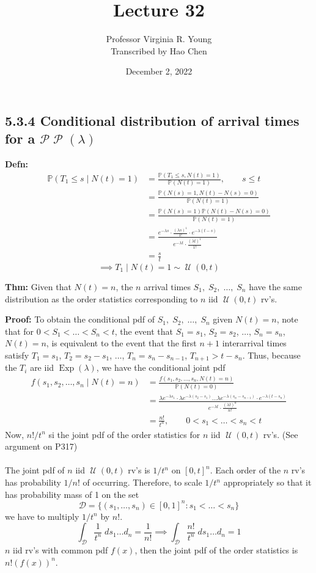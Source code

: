 \documentclass[a4paper]{article}
\title{Lecture 32}
\author{Professor Virginia R. Young\\ \small{Transcribed by Hao Chen}}
\date{December 2, 2022}
\newcommand{\n}{\hfill\break}
\newcommand{\defn}[1]{\par\noindent\settowidth{\hangindent}{\textbf{Defn: }}\textbf{Defn: }#1\n}
\newcommand{\thm}[1]{\par\noindent\settowidth{\hangindent}{\textbf{Thm: }}\textbf{Thm: }#1\n}
\newcommand{\pf}[1]{\par\noindent\settowidth{\hangindent}{\textbf{Proof: }}\textbf{Proof: }#1\n}
\newcommand{\Prob}{\mathbb{P}}
\renewcommand{\P}{\Prob}
\DeclareMathOperator{\Unif}{\mathcal{U}}
\DeclareMathOperator{\Poiss}{\mathcal{P}}
\DeclareMathOperator{\Exp}{\text{Exp}}
\begin{document}
\maketitle

\subsection*{5.3.4 Conditional distribution of arrival times for a $\mathcal{P}\Poiss(\lambda)$}

\defn{
\begin{align*}
    \P(T_1\leq s\mid N(t)=1)&=\frac{\P(T_1\leq s, N(t)=1)}{\P(N(t)=1)},\qquad s\leq t \\
    &=\frac{\P(N(s)=1, N(t)-N(s)=0)}{\P(N(t)=1)} \\
    &=\frac{\P(N(s)=1)\P(N(t)-N(s)=0)}{\P(N(t)=1)} \\ %
    &=\frac{e^{-\lambda s}\cdot\frac{(\lambda s)^1}{1!}\cdot e^{-\lambda(t-s)}}{e^{-\lambda t}\cdot\frac{(\lambda t)^1}{1!}} \\
    &=\frac{s}{t}
\end{align*}
\[\implies T_1\mid N(t)=1\sim\Unif(0,t)\]
}

\thm{
Given that $N(t)=n$, the $n$ arrival times $S_1,\;S_2,\;\dots,\;S_n$ have the same distribution as the order statistics corresponding to $n$ iid $\Unif(0, t)$ rv's.
}

\pf{
To obtain the conditional pdf of $S_1,\;S_2,\;\dots,\;S_n$ given $N(t)=n$, note that for $0<S_1<\dots<S_n<t$, the event that $S_1=s_1$, $S_2=s_2$, $\dots$, $S_n=s_n$, $N(t)=n$, is equivalent to the event that the first $n+1$ interarrival times satisfy $T_1=s_1$, $T_2=s_2-s_1$, $\dots$, $T_n=s_n-s_{n-1}$, $T_{n+1}>t-s_n$. Thus, because the $T_i$ are iid $\Exp(\lambda)$, we have the conditional joint pdf
\begin{align*}
    f(s_1, s_2, \dots, s_n\mid N(t)=n)&=\frac{f(s_1, s_2, \dots, s_n, N(t)=n)}{\P(N(t)=0)} \\
    &=\frac{\lambda e^{-\lambda s_1}\cdot\lambda e^{-\lambda(s_2-s_1)}\dots\lambda e^{-\lambda(s_n-s_{n-1})}\cdot e^{-\lambda(t-s_n)}}{e^{-\lambda t}\cdot\frac{(\lambda t)^n}{n!}} \\
    &=\frac{n!}{t^n}, \qquad 0<s_1<\dots<s_n<t
\end{align*}
Now, $n!/t^n$ si the joint pdf of the order statistics for $n$ iid $\Unif(0, t)$ rv's. (See argument on P317)
\\\\
The joint pdf of $n$ iid $\Unif(0,t)$ rv's is $1/t^n$ on $[0,t]^n$. Each order of the $n$ rv's has probability $1/n!$ of occurring. Therefore, to scale $1/t^n$ appropriately so that it has probability mass of 1 on the set 
\[\mathcal{D}=\{(s_1, \dots, s_n)\in[0,1]^n:s_1<\dots<s_n\}\]
we have to multiply $1/t^n$ by $n!$.
\[\int_\mathcal{D}\frac{1}{t^n}\;ds_1\dots d_n=\frac{1}{n!}\implies\int_\mathcal{D}\frac{n!}{t^n}\;ds_1\dots d_n=1\]
$n$ iid rv's with common pdf $f(x)$, then the joint pdf of the order statistics is $n!(f(x))^n$.
}
\end{document}

